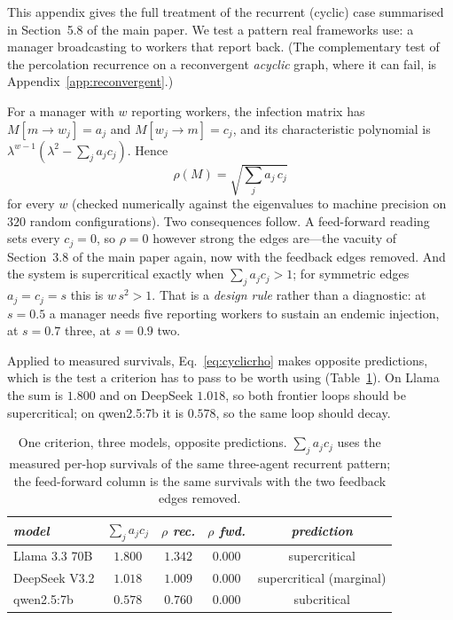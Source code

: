\documentclass[sigconf,anonymous]{aamas}
\begin{document}
This appendix gives the full treatment of the recurrent (cyclic) case summarised in
Section~5.8 of the main paper. We test a pattern real frameworks use: a manager
broadcasting to workers that report back. (The complementary test of the percolation
recurrence on a reconvergent \emph{acyclic} graph, where it can fail, is
Appendix~\ref{app:reconvergent}.)

For a manager with $w$ reporting workers, the infection matrix has
$M[m\!\to\! w_j] = a_j$ and $M[w_j\!\to\! m] = c_j$, and its characteristic
polynomial is $\lambda^{w-1}(\lambda^2 - \sum_j a_j c_j)$. Hence
\begin{equation}
  \rho(M) = \sqrt{\textstyle\sum_j a_j\,c_j}
  \label{eq:cyclicrho}
\end{equation}
for every $w$ (checked numerically against the eigenvalues to machine precision on
$320$ random configurations). Two consequences follow. A feed-forward reading sets
every $c_j = 0$, so $\rho = 0$ however strong the edges are---the vacuity of
Section~3.8 of the main paper again, now with the feedback edges removed. And the
system is supercritical exactly when $\sum_j a_j c_j > 1$; for symmetric edges
$a_j = c_j = s$ this is $w\,s^2 > 1$. That is a \emph{design rule} rather than a
diagnostic: at $s = 0.5$ a manager needs five reporting workers to sustain an
endemic injection, at $s = 0.7$ three, at $s = 0.9$ two.

Applied to measured survivals, Eq.~\eqref{eq:cyclicrho} makes opposite
predictions, which is the test a criterion has to pass to be worth using
(Table~\ref{tab:cyclic}). On Llama the sum is $1.800$ and on DeepSeek $1.018$, so both
frontier loops should be supercritical; on qwen2.5:7b it is $0.578$, so the same loop
should decay.

\begin{table}[h]
\small
\centering
\caption{One criterion, three models, opposite predictions. $\sum_j a_jc_j$ uses
the measured per-hop survivals of the same three-agent recurrent pattern; the
feed-forward column is the same survivals with the two feedback edges removed.}
\vspace{10pt} %
\label{tab:cyclic}
\begin{tabular}{lcccc}
\toprule
\textit{model} & \textit{$\sum_j a_jc_j$} & \textit{$\rho$ rec.}
& \textit{$\rho$ fwd.} & \textit{prediction} \\
\midrule
Llama 3.3 70B & $1.800$ & $\mathbf{1.342}$ & $0.000$ & supercritical \\
DeepSeek V3.2 & $1.018$ & $\mathbf{1.009}$ & $0.000$ & supercritical (marginal) \\
qwen2.5:7b    & $0.578$ & $0.760$ & $0.000$ & subcritical \\
\bottomrule
\end{tabular}
\end{table}
\end{document}
